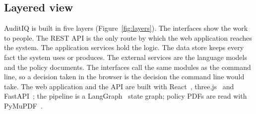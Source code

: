 \documentclass[11pt,a4paper]{article}
\begin{document}
\subsection{Layered view}
AuditIQ is built in five layers (Figure~\ref{fig:layers}). The interfaces show the work to people. The REST API is the only route by which the web application reaches the system. The application services hold the logic. The data store keeps every fact the system uses or produces. The external services are the language models and the policy documents. The interfaces call the same modules as the command line, so a decision taken in the browser is the decision the command line would take. The web application and the API are built with React~\cite{r3f}, three.js~\cite{threejs} and FastAPI~\cite{fastapi}; the pipeline is a LangGraph~\cite{langgraph} state graph; policy PDFs are read with PyMuPDF~\cite{pymupdf}.
\end{document}
